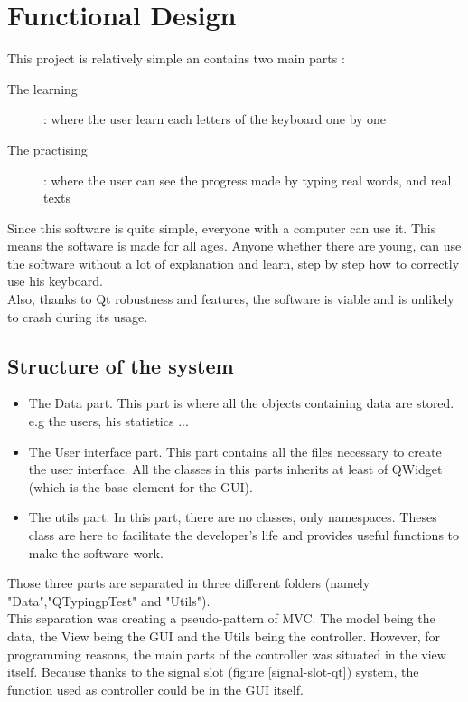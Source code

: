 \chapter{Functional Design}
This project is relatively simple an contains two main parts :
\begin{description}
	\item[The learning] : where the user learn each letters of the keyboard one by one
	\item[The practising] : where the user can see the progress made by typing real words, and real texts
\end{description}
Since this software is quite simple, everyone with a computer can use it. This means the software is made for all ages. Anyone whether there are young, can use the software without a lot of explanation and learn, step by step how to correctly use his keyboard.\\
Also, thanks to Qt robustness and features, the software is viable and is unlikely to crash during its usage.

\section{Structure of the system}

\begin{itemize}
	\item The Data part. This part is where all the objects containing data are stored. e.g the users, his statistics ... 
	\item The User interface part. This part contains all the files necessary to create the user interface. All the classes in this parts inherits at least of QWidget (which is the base element for the GUI).
	\item The utils part. In this part, there are no classes, only namespaces. Theses class are here to facilitate the developer's life and provides useful functions to make the software work.  
\end{itemize}

Those three parts are separated in three different folders (namely "Data","QTypingpTest" and "Utils").\\

This separation was creating a pseudo-pattern of MVC. The model being the data, the View being the GUI and the Utils being the controller. However, for programming reasons, the main parts of the controller was situated in the view itself. Because thanks to the signal slot (figure \ref{signal-slot-qt}) system, the function used as controller could be in the GUI itself.



